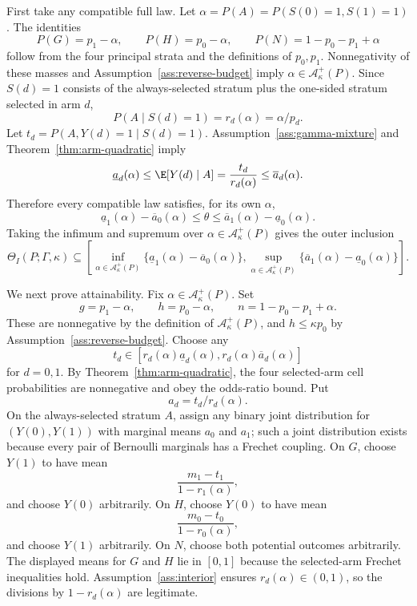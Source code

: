 First take any compatible full law.  Let
\(\alpha=P(A)=P(S(0)=1,S(1)=1)\).  The identities
\[
  P(G)=p_1-\alpha,\qquad P(H)=p_0-\alpha,\qquad
  P(N)=1-p_0-p_1+\alpha
\]
follow from the four principal strata and the definitions of \(p_0,p_1\).
Nonnegativity of these masses and Assumption~\ref{ass:reverse-budget} imply
\(\alpha\in\mathcal A_\kappa^+(P)\).  Since \(S(d)=1\) consists of the
always-selected stratum plus the one-sided stratum selected in arm \(d\),
\[
  P(A\mid S(d)=1)=r_d(\alpha)=\alpha/p_d .
\]
Let \(t_d=P(A,Y(d)=1\mid S(d)=1)\).  Assumption~\ref{ass:gamma-mixture} and
Theorem~\ref{thm:arm-quadratic} imply
\[
  \underline a_d(\alpha)\le
  \E[Y(d)\mid A]=\frac{t_d}{r_d(\alpha)}
  \le \overline a_d(\alpha).
\]
Therefore every compatible law satisfies, for its own \(\alpha\),
\[
  \underline a_1(\alpha)-\overline a_0(\alpha)
  \le
  \theta
  \le
  \overline a_1(\alpha)-\underline a_0(\alpha).
\]
Taking the infimum and supremum over
\(\alpha\in\mathcal A_\kappa^+(P)\) gives the outer inclusion
\[
  \Theta_I(P;\Gamma,\kappa)
  \subseteq
  \left[
    \inf_{\alpha\in\mathcal A_\kappa^+(P)}
      \{\underline a_1(\alpha)-\overline a_0(\alpha)\},
    \sup_{\alpha\in\mathcal A_\kappa^+(P)}
      \{\overline a_1(\alpha)-\underline a_0(\alpha)\}
  \right].
\]

We next prove attainability.  Fix \(\alpha\in\mathcal A_\kappa^+(P)\).  Set
\[
  g=p_1-\alpha,\qquad h=p_0-\alpha,\qquad n=1-p_0-p_1+\alpha .
\]
These are nonnegative by the definition of \(\mathcal A_\kappa^+(P)\), and
\(h\le \kappa p_0\) by Assumption~\ref{ass:reverse-budget}.  Choose any
\[
  t_d\in
  [r_d(\alpha)\underline a_d(\alpha),
   r_d(\alpha)\overline a_d(\alpha)]
\]
for \(d=0,1\).  By Theorem~\ref{thm:arm-quadratic}, the four selected-arm cell
probabilities are nonnegative and obey the odds-ratio bound.  Put
\[
  a_d=t_d/r_d(\alpha).
\]
On the always-selected stratum \(A\), assign any binary joint distribution for
\((Y(0),Y(1))\) with marginal means \(a_0\) and \(a_1\); such a joint
distribution exists because every pair of Bernoulli marginals has a Frechet
coupling.  On \(G\), choose \(Y(1)\) to have mean
\[
  \frac{m_1-t_1}{1-r_1(\alpha)},
\]
and choose \(Y(0)\) arbitrarily.  On \(H\), choose \(Y(0)\) to have mean
\[
  \frac{m_0-t_0}{1-r_0(\alpha)},
\]
and choose \(Y(1)\) arbitrarily.  On \(N\), choose both potential outcomes
arbitrarily.  The displayed means for \(G\) and \(H\) lie in \([0,1]\) because
the selected-arm Frechet inequalities hold.  Assumption~\ref{ass:interior}
ensures \(r_d(\alpha)\in(0,1)\), so the divisions by
\(1-r_d(\alpha)\) are legitimate.


